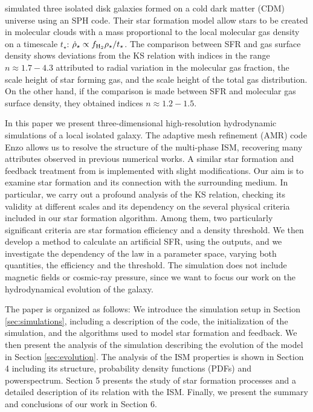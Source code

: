 \documentclass[twocolumn]{aastex}
\newcommand{\rhostar}{\rho_\star}
\newcommand{\rhostardot}{\dot{\rho}_\star}
\begin{document}
\citet{Robertson_08} simulated three isolated disk galaxies formed on a cold dark matter (CDM) universe using an SPH code. Their star formation model allow stars to be created in molecular clouds with a mass proportional to the local molecular gas density on a timescale $t_\star$: $\rhostardot \propto f_{\rm H_2} \rhostar/t_\star$. The comparison between SFR and gas surface density shows deviations from the KS relation with indices in the range $n \approx 1.7-4.3$ attributed to radial variation in the molecular gas fraction, the scale height of star forming gas, and the scale height of the total gas distribution. On the other hand, if the comparison is made between SFR and molecular gas surface density, they obtained indices $n \approx 1.2 - 1.5$.

In this paper we present three-dimensional high-resolution hydrodynamic simulations of a local isolated galaxy. The adaptive mesh refinement (AMR) code Enzo allows us to resolve the structure of the multi-phase ISM, recovering many attributes observed in previous numerical works. A similar star formation and feedback treatment from \citet{Tasker_Bryan_06} is implemented with slight modifications. Our aim is to examine star formation and its connection with the surrounding medium. In particular, we carry out a profound analysis of the KS relation, checking its validity at different scales and its dependency on the several physical criteria included in our star formation algorithm. Among them, two particularly significant criteria are star formation efficiency and a density threshold. We then develop a method to calculate an artificial SFR, using the outputs, and we investigate the dependency of the law in a parameter space, varying both quantities, the efficiency and the threshold. The simulation does not include magnetic fields or cosmic-ray pressure, since we want to focus our work on the hydrodynamical evolution of the galaxy.

The paper is organized as follows: We introduce the simulation setup in Section \ref{sec:simulations}, including a description of the code, the initialization of the simulation, and the algorithms used to model star formation and feedback. We then present the analysis of the simulation describing the evolution of the model in Section \ref{sec:evolution}. The analysis of the ISM properties is shown in Section 4 including its structure, probability density functions (PDFs) and powerspectrum. Section 5 presents the study of star formation processes and a detailed description of its relation with the ISM. Finally, we present the summary and conclusions of our work in Section 6.
\end{document}
